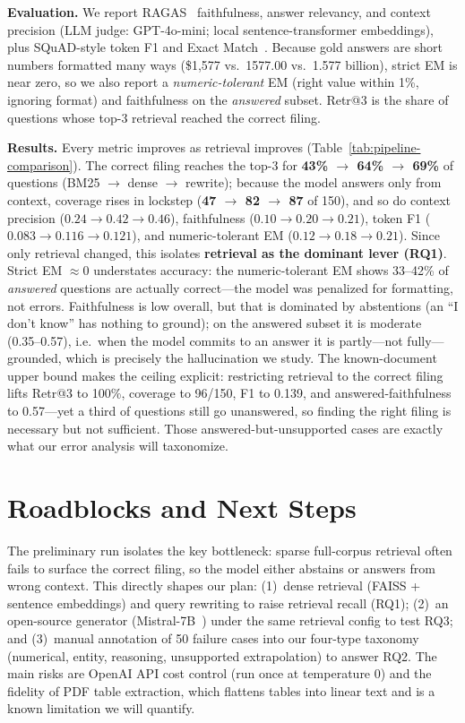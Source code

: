 \documentclass[11pt]{article}
\begin{document}
\textbf{Evaluation.} We report RAGAS~\citep{es2024ragas} faithfulness, answer
relevancy, and context precision (LLM judge: GPT-4o-mini; local
sentence-transformer embeddings), plus SQuAD-style token F1 and Exact
Match~\citep{rajpurkar2016squad}. Because gold answers are short numbers formatted
many ways (\$1{,}577 vs.\ 1577.00 vs.\ 1.577 billion), strict EM is near zero, so we
also report a \emph{numeric-tolerant} EM (right value within 1\%, ignoring format)
and faithfulness on the \emph{answered} subset. Retr@3 is the share of questions
whose top-3 retrieval reached the correct filing.



\textbf{Results.} Every metric improves as retrieval improves
(Table~\ref{tab:pipeline-comparison}). The correct filing reaches the top-3 for
\textbf{43\% $\rightarrow$ 64\% $\rightarrow$ 69\%} of questions
(BM25 $\rightarrow$ dense $\rightarrow$ rewrite); because the model answers only from
context, coverage rises in lockstep (\textbf{47 $\rightarrow$ 82 $\rightarrow$ 87} of
150), and so do context precision ($0.24 \rightarrow 0.42 \rightarrow 0.46$),
faithfulness ($0.10 \rightarrow 0.20 \rightarrow 0.21$), token F1
($0.083 \rightarrow 0.116 \rightarrow 0.121$), and numeric-tolerant EM
($0.12 \rightarrow 0.18 \rightarrow 0.21$). Since only retrieval changed, this isolates
\textbf{retrieval as the dominant lever (RQ1)}. Strict EM $\approx$0 understates
accuracy: the numeric-tolerant EM shows 33--42\% of \emph{answered} questions are
actually correct---the model was penalized for formatting, not errors. Faithfulness is
low overall, but that is dominated by abstentions (an ``I don't know'' has nothing to
ground); on the answered subset it is moderate (0.35--0.57), i.e.\ when the model
commits to an answer it is partly---not fully---grounded, which is precisely the
hallucination we study. The known-document upper bound makes the ceiling explicit:
restricting retrieval to the correct filing lifts Retr@3 to 100\%, coverage to 96/150,
F1 to 0.139, and answered-faithfulness to 0.57---yet a third of questions still go
unanswered, so finding the right filing is necessary but not sufficient. Those
answered-but-unsupported cases are exactly what our error analysis will taxonomize.

\section{Roadblocks and Next Steps}
\label{sec:next}
The preliminary run isolates the key bottleneck: sparse full-corpus retrieval
often fails to surface the correct filing, so the model either abstains or
answers from wrong context. This directly shapes our plan: (1)~dense retrieval
(FAISS + sentence embeddings) and query rewriting to raise retrieval recall
(RQ1); (2)~an open-source generator (Mistral-7B~\citep{jiang2023mistral}) under
the same retrieval config to test RQ3; and (3)~manual annotation of 50 failure
cases into our four-type taxonomy (numerical, entity, reasoning, unsupported
extrapolation) to answer RQ2. The main risks are OpenAI API cost control (run
once at temperature 0) and the fidelity of PDF table extraction, which flattens
tables into linear text and is a known limitation we will quantify.
\end{document}
